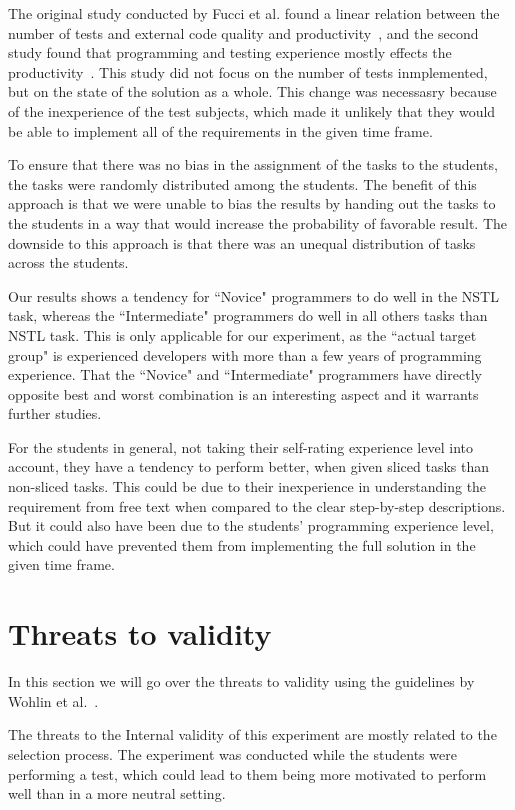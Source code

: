 \documentclass{sig-alternate-05-2015}
\begin{document}
The original study conducted by Fucci et al. found a linear relation between the number of tests and external code quality and productivity~\cite{fucci2}, and the second study found that programming and testing experience mostly effects the productivity~\cite{fucci1}. This study did not focus on the number of tests inmplemented, but on the state of the solution as a whole. This change was necessasry because of the inexperience of the test subjects, which made it unlikely that they would be able to implement all of the requirements in the given time frame.

To ensure that there was no bias in the assignment of the tasks to the students, the tasks were randomly distributed among the students. The benefit of this approach is that we were unable to bias the results by handing out the tasks to the students in a way that would increase the probability of favorable result. The downside to this approach is that there was an unequal distribution of tasks across the students.

Our results shows a tendency for ``Novice" programmers to do well in the NSTL task, whereas the ``Intermediate" programmers do well in all others tasks than NSTL task. This is only applicable for our experiment, as the ``actual target group" is experienced developers with more than a few years of programming experience. That the ``Novice" and ``Intermediate" programmers have directly opposite  best and worst combination is an interesting aspect and it warrants  further studies.

For the students in general, not taking their self-rating experience level into account, they have a tendency to perform better, when given sliced tasks than non-sliced tasks. This could be due to their inexperience in understanding the requirement from free text when compared to the clear step-by-step descriptions. But it could also have been due to the students' programming experience level, which could have prevented them from implementing the full solution in the given time frame.

\section{Threats to validity}
\label{sec:Threats to validity}
In this section we will go over the threats to validity using the guidelines by Wohlin et al.~\cite{wohlin1}.

The threats to the Internal validity of this experiment are mostly related to the selection process. The experiment was conducted while the students were performing a test, which could lead to them being more motivated to perform well than in a more neutral setting.
\end{document}
